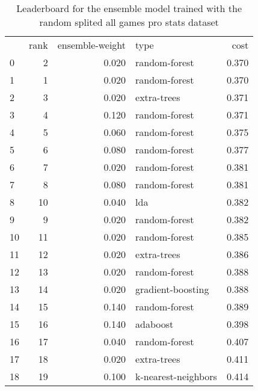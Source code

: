\begin{table}[]
	\centering
	\begin{tabular}{lrrlr}
		   & rank & ensemble-weight & type                & cost  \\
		0  & 2    & 0.020           & random-forest       & 0.370 \\
		1  & 1    & 0.020           & random-forest       & 0.370 \\
		2  & 3    & 0.020           & extra-trees         & 0.371 \\
		3  & 4    & 0.120           & random-forest       & 0.371 \\
		4  & 5    & 0.060           & random-forest       & 0.375 \\
		5  & 6    & 0.080           & random-forest       & 0.377 \\
		6  & 7    & 0.020           & random-forest       & 0.381 \\
		7  & 8    & 0.080           & random-forest       & 0.381 \\
		8  & 10   & 0.040           & lda                 & 0.382 \\
		9  & 9    & 0.020           & random-forest       & 0.382 \\
		10 & 11   & 0.020           & random-forest       & 0.385 \\
		11 & 12   & 0.020           & extra-trees         & 0.386 \\
		12 & 13   & 0.020           & random-forest       & 0.388 \\
		13 & 14   & 0.020           & gradient-boosting   & 0.388 \\
		14 & 15   & 0.140           & random-forest       & 0.389 \\
		15 & 16   & 0.140           & adaboost            & 0.398 \\
		16 & 17   & 0.040           & random-forest       & 0.407 \\
		17 & 18   & 0.020           & extra-trees         & 0.411 \\
		18 & 19   & 0.100           & k-nearest-neighbors & 0.414 \\
	\end{tabular}

	\caption{Leaderboard for the ensemble model trained with the random splited all games pro stats dataset}
	\label{tab:lb-all-games-pro-only-spring-randsplit}
\end{table}

